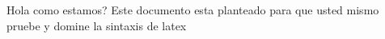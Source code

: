 \documentclass[a4paper]{article} %
\begin{document}
    \begin{titlepage}
    \centering
    Hola como estamos?
    Este documento esta planteado para que usted mismo
    pruebe y domine la sintaxis de latex
    \end{titlepage}
\end{document}
